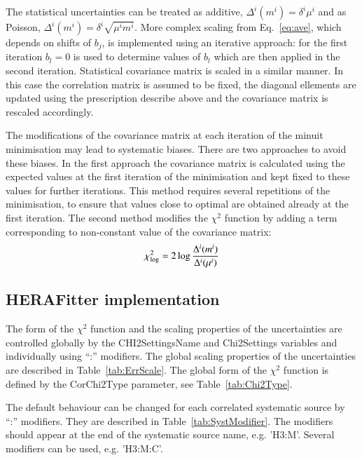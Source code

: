 The statistical uncertainties can be treated as additive, $\Delta^i(m^i) = \delta^i \mu^i$  and as Poisson,
$\Delta^i(m^i) = \delta^i \sqrt{\mu^i m^i}$. More complex scaling from Eq.~\ref{eq:ave}, 
which depends on shifts of $b_j$, is implemented using an iterative approach: for the first iteration $b_l =0$ 
 is used to determine values of $b_l$ which are then applied in the second iteration. Statistical covariance
matrix is scaled in a similar manner. In this case the correlation matrix is assumed to be fixed, the diagonal
ellements are updated using the prescription describe above and the covariance matrix is rescaled accordingly.

The modifications of the covariance matrix at each iteration of the minuit minimisation may lead to systematic
biases. There are two approaches to avoid these biases. In the first approach the covariance matrix is calculated
using the expected values at the first iteration of the minimisation and kept fixed to these values for further
iterations. This method requires several repetitions of the minimisation, to ensure that values close to optimal
are obtained already at the first iteration. The second method modifies the $\chi^2$ function by adding a term
corresponding to non-constant value of the covariance matrix:
\begin{equation}
 \chi^2_{\rm log} = 2 \log \frac{\Delta^i(m^i)}{\Delta^i(\mu^i)} 
\end{equation}  

\subsection{HERAFitter implementation}
The form of the $\chi^2$ function and the scaling properties of the 
uncertainties are controlled globally by the {\sc CHI2SettingsName} and
{\sc  Chi2Settings} variables and individually using {\sc ``:''} modifiers.
The global scaling properties of the uncertainties are described in 
Table~\ref{tab:ErrScale}. The global form of the $\chi^2$ function
is defined by the {\sc CorChi2Type} parameter, see   
Table~\ref{tab:Chi2Type}.

The default behaviour can be changed for each correlated systematic source by ``:'' modifiers.
They are described in Table~\ref{tab:SystModifier}. The modifiers should appear at the end 
of the systematic source name, e.g. {\sc 'H3:M'}. Several modifiers can be used, e.g. {\sc 'H3:M:C'}.

